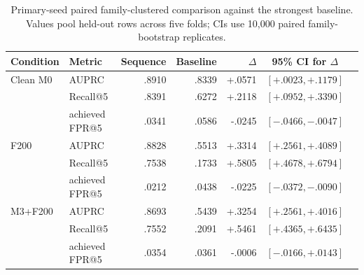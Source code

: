 \begin{table}[t]
  \centering
  \caption{Primary-seed paired family-clustered comparison against the strongest baseline. Values
  pool held-out rows across five folds; CIs use 10,000 paired family-bootstrap replicates.}
  \label{tab:bootstrap}
  \scriptsize
  \setlength{\tabcolsep}{4.2pt}
  \begin{tabular}{@{}llrrrrl@{}}
    \toprule
    Condition & Metric & Sequence & Baseline & $\Delta$ & \multicolumn{1}{c}{95\% CI for $\Delta$} \\
    \midrule
    Clean M0 & AUPRC & .8910 & .8339 & +.0571 & $[+.0023,+.1179]$ \\
             & Recall@5 & .8391 & .6272 & +.2118 & $[+.0952,+.3390]$ \\
             & achieved FPR@5 & .0341 & .0586 & -.0245 & $[-.0466,-.0047]$ \\
    \midrule
    F200 & AUPRC & .8828 & .5513 & +.3314 & $[+.2561,+.4089]$ \\
         & Recall@5 & .7538 & .1733 & +.5805 & $[+.4678,+.6794]$ \\
         & achieved FPR@5 & .0212 & .0438 & -.0225 & $[-.0372,-.0090]$ \\
    \midrule
    M3+F200 & AUPRC & .8693 & .5439 & +.3254 & $[+.2561,+.4016]$ \\
            & Recall@5 & .7552 & .2091 & +.5461 & $[+.4365,+.6435]$ \\
            & achieved FPR@5 & .0354 & .0361 & -.0006 & $[-.0166,+.0143]$ \\
    \bottomrule
  \end{tabular}
\end{table}

